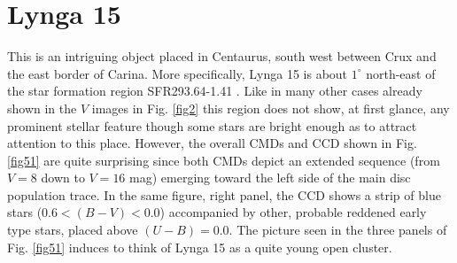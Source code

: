 \documentclass[draft]{aa}
\begin{document}
\section{Lynga 15}

This is an intriguing object placed in Centaurus, south west between Crux and
the east border of Carina. More specifically, Lynga 15 is about $1^\circ$
north-east of the star formation region SFR293.64-1.41 \citep{Avedisova_2002}.
Like in many other cases already shown in the $V$ images in Fig. \ref{fig2}
this region does not show, at first glance, any prominent stellar feature
though some stars are bright enough as to attract attention to this place.
However, the overall CMDs and CCD shown in Fig. \ref{fig51}
are quite surprising since both CMDs depict an extended sequence (from $V = 8$
down to $V = 16$ mag) emerging toward the left side of the main disc population
trace. In the same figure, right panel, the CCD shows a strip of blue stars
($0.6<(B-V)<0.0$) accompanied by other, probable reddened early type stars,
placed above $(U-B) = 0.0$. The picture seen in the three panels of Fig.
\ref{fig51} induces to think of Lynga 15 as a quite young open cluster.\\
\end{document}

